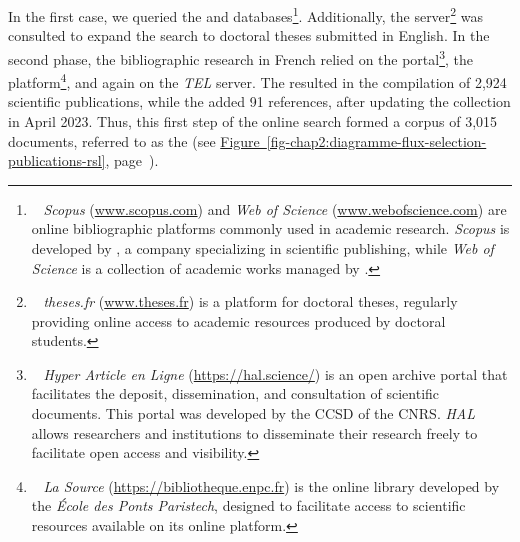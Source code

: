 \begin{refsegment}
In the first case, we queried the  and  databases\footnote{~
    \textsl{Scopus} (\url{www.scopus.com}) and \textsl{Web of Science} (\url{www.webofscience.com}) are online bibliographic platforms commonly used in academic research. \textsl{Scopus} is developed by , a company specializing in scientific publishing, while \textsl{Web of Science} is a collection of academic works managed by .
}. Additionally, the  server\footnote{~
    \textsl{theses.fr} (\url{www.theses.fr}) is a platform for doctoral theses, regularly providing online access to academic resources produced by doctoral students.
} was consulted to expand the search to doctoral theses submitted in English. In the second phase, the bibliographic research in French relied on the  portal\footnote{~
    \textsl{Hyper Article en Ligne} (\url{https://hal.science/}) is an open archive portal that facilitates the deposit, dissemination, and consultation of scientific documents. This portal was developed by the \acrfull{CCSD} of the \acrfull{CNRS}. \textsl{HAL} allows researchers and institutions to disseminate their research freely to facilitate open access and visibility.
}, the  platform\footnote{~
    \textsl{La Source} (\url{https://bibliotheque.enpc.fr}) is the online library developed by the \textsl{École des Ponts Paristech}, designed to facilitate access to scientific resources available on its online platform.
}, and again on the \textsl{TEL} server. The  resulted in the compilation of 2,924 scientific publications, while the  added 91 references, after updating the collection in April 2023. Thus, this first step of the online search formed a corpus of 3,015 documents, referred to as the  (see \hyperref[fig-chap2:diagramme-flux-selection-publications-rsl]{Figure~\ref{fig-chap2:diagramme-flux-selection-publications-rsl}}, page~\pageref{fig-chap2:diagramme-flux-selection-publications-rsl}).%



\end{refsegment}
